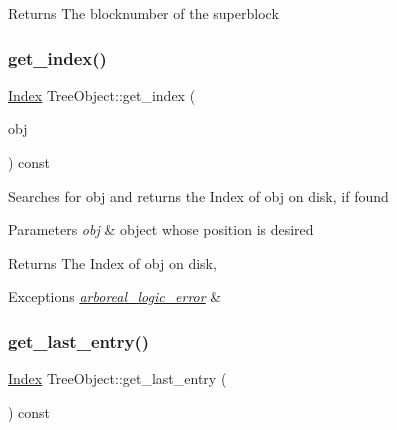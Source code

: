 \begin{DoxyReturn}{Returns}
The blocknumber of the superblock 
\end{DoxyReturn}
\mbox{\label{classTreeObject_ae0983a3ff99d413e22beaaac8d7b6d12}} 
\subsubsection{\texorpdfstring{get\+\_\+index()}{get\_index()}}
{\footnotesize\ttfamily \mbox{\hyperlink{structindex}{Index}} Tree\+Object\+::get\+\_\+index (\begin{DoxyParamCaption}\item[{\mbox{\hyperlink{classTreeObject}{Tree\+Object}} $\ast$}]{obj }\end{DoxyParamCaption}) const}

Searches for obj and returns the Index of obj on disk, if found 
\begin{DoxyParams}{Parameters}
{\em obj} & object whose position is desired \\
\hline
\end{DoxyParams}
\begin{DoxyReturn}{Returns}
The Index of obj on disk, 
\end{DoxyReturn}

\begin{DoxyExceptions}{Exceptions}
{\em \mbox{\hyperlink{classarboreal__logic__error}{arboreal\+\_\+logic\+\_\+error}}} & \\
\hline
\end{DoxyExceptions}
\mbox{\label{classTreeObject_a2d7c1a4c2d36c81110ccae09d9724125}} 
\subsubsection{\texorpdfstring{get\+\_\+last\+\_\+entry()}{get\_last\_entry()}}
{\footnotesize\ttfamily \mbox{\hyperlink{structindex}{Index}} Tree\+Object\+::get\+\_\+last\+\_\+entry (\begin{DoxyParamCaption}{ }\end{DoxyParamCaption}) const}

